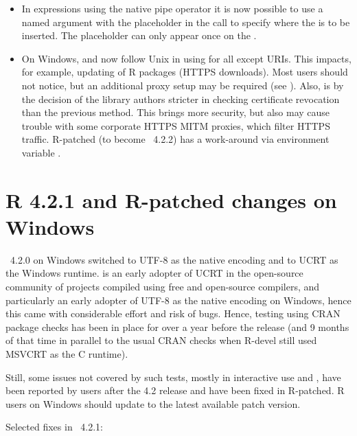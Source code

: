 \begin{itemize}
 \item{} In  expressions using the native pipe operator
  it is now possible to use a named argument with the placeholder
  \code{\_} in the  call to specify where the  is to
  be inserted.  The placeholder can only appear once on the .

 \item{}  On Windows,  and
   now follow Unix in using 
  for all except  URIs.  This impacts, for example, updating of
  R packages (HTTPS downloads).  Most users should not notice, but
  an additional proxy setup may be required (see  ).
  Also,  is by the decision of the library authors stricter
  in checking certificate revocation than the previous 
  method.  This brings more security, but also may cause trouble with some
  corporate HTTPS MITM proxies, which filter HTTPS traffic.  R-patched (to
  become \R{}~4.2.2) has a work-around via environment variable
  .

\end{itemize}


\section{R 4.2.1 and R-patched changes on Windows}

\R{}~4.2.0 on Windows switched to UTF-8 as the native encoding and to UCRT
as the Windows runtime.  \R{} is an early adopter of UCRT in the open-source
community of projects compiled using free and open-source compilers, and
particularly an early adopter of UTF-8 as the native encoding on Windows,
hence this came with considerable effort and risk of bugs.  Hence, testing
using CRAN package checks has been in place for over a year before the
release (and 9 months of that time in parallel to the usual CRAN checks when
R-devel still used MSVCRT as the C runtime).

Still, some issues not covered by such tests, mostly in interactive use and
, have been reported by users after the 4.2 release and have
been fixed in R-patched.  R users on Windows should update to the latest
available patch version.

Selected fixes in \R{}~4.2.1:

